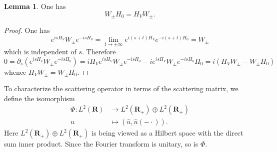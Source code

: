 \documentclass[12pt]{report}
\newcommand{\RR}{\mathbf{R}}
\theoremstyle{definition}
\newtheorem{lemma}[theorem]{Lemma}
\begin{document}
\begin{lemma}
One has
$$W_\pm H_0 = H_VW_\pm.$$
\end{lemma}
\begin{proof}
One has
$$e^{isH_V}W_\pm e^{-isH_0} = \lim_{t \to \pm \infty} e^{i(s+t)H_V}e^{-i(s+t)H_0} = W_\pm$$
which is independent of $s$. Therefore
$$0 = \partial_s(e^{isH_V}W_\pm e^{-isH_0}) = iH_Ve^{isH_V}W_\pm e^{-isH_0} - ie^{isH_V}W_\pm e^{-isH_0}H_0 = i(H_VW_\pm - W_\pm H_0)$$
whence $H_VW_\pm = W_\pm H_0$.
\end{proof}

To characterize the scattering operator in terms of the scattering matrix, we define the isomorphism
\begin{align*}
  \Phi: L^2(\RR) &\to L^2(\RR_+) \oplus L^2(\RR_+)\\
  u &\mapsto (\hat u, \hat u(-\cdot)).
\end{align*}
Here $L^2(\RR_+) \oplus L^2(\RR_+)$ is being viewed as a Hilbert space with the direct sum inner product. Since the Fourier transform is unitary, so is $\Phi$.
\end{document}

